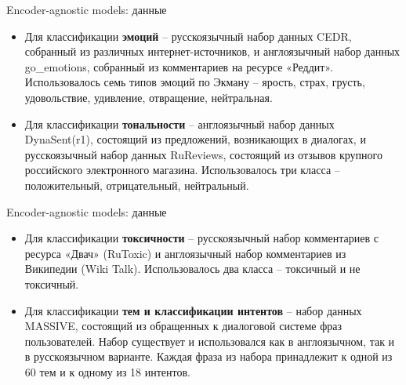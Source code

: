 \begin{frame}{Encoder-agnostic models: данные}
\begin{itemize}
    \item Для классификации \textbf{эмоций} -- русскоязычный набор данных CEDR, собранный из различных интернет-источников, и англоязычный набор данных go\_emotions, собранный из комментариев на ресурсе «Реддит». Использовалось семь типов эмоций по Экману -- ярость, страх, грусть, удовольствие, удивление, отвращение, нейтральная.
    \item Для классификации \textbf{тональности} -- англоязычный набор данных DynaSent(r1), состоящий из предложений, возникающих в диалогах, и русскоязычный набор данных RuReviews, состоящий из отзывов крупного российского электронного магазина. Использовалось три класса -- положительный, отрицательный, нейтральный.
\end{itemize}
\end{frame}

\begin{frame}{Encoder-agnostic models: данные}
\begin{itemize}
    \item Для классификации \textbf{токсичности} -- русскоязычный набор комментариев с ресурса «Двач» (RuToxic) и англоязычный набор комментариев из Википедии (Wiki Talk). Использовалось два класса -- токсичный и не токсичный.
    \item Для классификации \textbf{тем и классификации интентов} -- набор данных MASSIVE, состоящий из обращенных к диалоговой системе фраз пользователей. Набор существует и использовался как в англоязычном, так и в русскоязычном варианте. Каждая фраза из набора принадлежит к одной из 60 тем и к одному из 18 интентов.
\end{itemize}
\end{frame}

